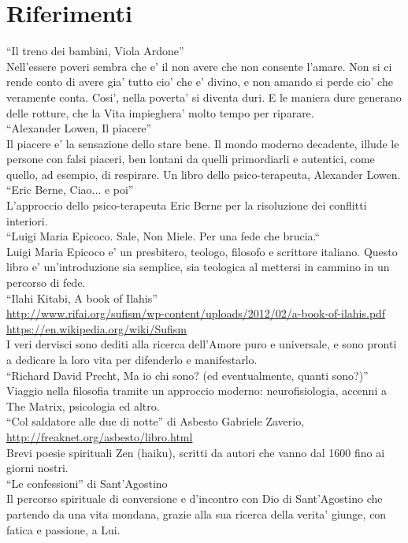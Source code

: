 \chapter{Riferimenti}
\label{chapRiferimenti}

  ``Il treno dei bambini, Viola Ardone''\\
  Nell'essere poveri sembra che e' il non avere che non consente l'amare. Non si ci rende conto di avere gia' tutto cio' che e' divino, e non amando si perde cio' che veramente conta. Cosi', nella poverta' si diventa duri. E le maniera dure generano delle rotture, che la Vita impieghera' molto tempo per riparare. \\

  ``Alexander Lowen, Il piacere''\\
  Il piacere e' la sensazione dello stare bene. Il mondo moderno decadente, illude le persone
  con falsi piaceri, ben lontani da quelli primordiarli e autentici, come quello, ad esempio,
  di respirare. Un libro dello psico-terapeuta, Alexander Lowen.\\
  
  ``Eric Berne, Ciao... e poi''\\
  L'approccio dello psico-terapeuta Eric Berne per la risoluzione dei conflitti interiori.\\
  
  ``Luigi Maria Epicoco. Sale, Non Miele. Per una fede che brucia.``\\
  Luigi Maria Epicoco e' un presbitero, teologo, filosofo e scrittore italiano. Questo libro e' un'introduzione sia semplice, sia teologica al mettersi in cammino in un percorso di fede.\\

  ``Ilahi Kitabi, A book of Ilahis''\\
  \url{http://www.rifai.org/sufism/wp-content/uploads/2012/02/a-book-of-ilahis.pdf}\\
  \url{https://en.wikipedia.org/wiki/Sufism}\\
  I veri dervisci sono dediti alla ricerca dell'Amore puro e universale, e sono pronti a
  dedicare la loro vita per difenderlo e manifestarlo.\\

  ``Richard David Precht, Ma io chi sono? (ed eventualmente, quanti sono?)''\\
  Viaggio nella filosofia tramite un approccio moderno: neurofisiologia, accenni a The Matrix, psicologia ed altro.\\
   
  ``Col saldatore alle due di notte'' di Asbesto Gabriele Zaverio,\\
  \url{http://freaknet.org/asbesto/libro.html}\\
  Brevi poesie spirituali Zen (haiku), scritti da autori che vanno dal 1600 fino ai giorni nostri.\\
    
  ``Le confessioni'' di Sant'Agostino\\
  Il percorso spirituale di conversione e d'incontro con Dio di Sant'Agostino che partendo da una vita mondana, grazie alla sua ricerca della verita' giunge, con fatica e passione, a Lui.\\


